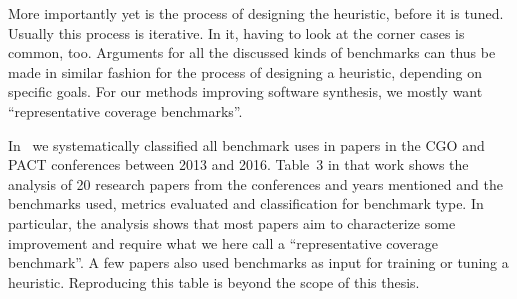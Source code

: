 More importantly yet is the process of designing the heuristic, before it is tuned. Usually this process is iterative. In it, having to look at the corner cases is common, too.
Arguments for all the discussed kinds of benchmarks can thus be made in similar fashion for the process of designing a heuristic, depending on specific goals.
For our methods improving software synthesis, we mostly want ``representative coverage benchmarks''.

In~\cite{goens_mapl19} we systematically classified all benchmark uses in papers in the \acs{CGO} and \acs{PACT} conferences between 2013 and 2016.
Table~3 in that work shows the analysis of 20 research papers from the conferences and years mentioned and the benchmarks used, metrics evaluated and classification for benchmark type.
In particular, the analysis shows that most papers aim to characterize some improvement and require what we here call a ``representative coverage benchmark''.
A few papers also used benchmarks as input for training or tuning a heuristic. 
Reproducing this table is beyond the scope of this thesis.